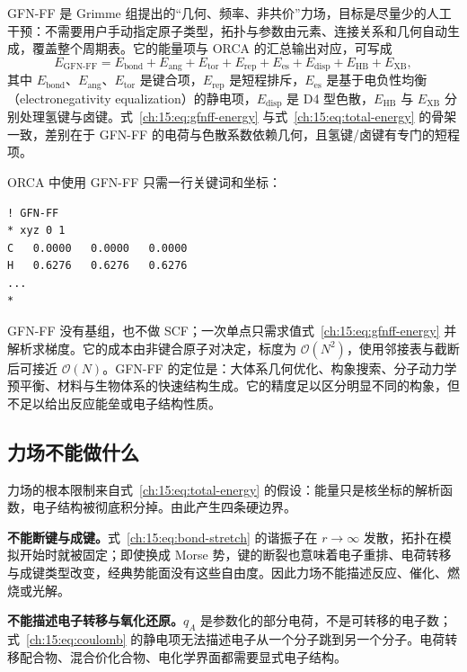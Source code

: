 GFN-FF 是 Grimme 组提出的“几何、频率、非共价”力场，目标是尽量少的人工干预：不需要用户手动指定原子类型，拓扑与参数由元素、连接关系和几何自动生成，覆盖整个周期表\citep{spicher2020gfnff}。它的能量项与 ORCA 的汇总输出对应，可写成
\begin{equation}
E_{\text{GFN-FF}}
= E_{\mathrm{bond}} + E_{\mathrm{ang}} + E_{\mathrm{tor}}
+ E_{\mathrm{rep}} + E_{\mathrm{es}} + E_{\mathrm{disp}}
+ E_{\mathrm{HB}} + E_{\mathrm{XB}},
\label{ch:15:eq:gfnff-energy}
\end{equation}
其中 $E_{\mathrm{bond}}$、$E_{\mathrm{ang}}$、$E_{\mathrm{tor}}$ 是键合项，$E_{\mathrm{rep}}$ 是短程排斥，$E_{\mathrm{es}}$ 是基于电负性均衡（electronegativity equalization）的静电项，$E_{\mathrm{disp}}$ 是 D4 型色散，$E_{\mathrm{HB}}$ 与 $E_{\mathrm{XB}}$ 分别处理氢键与卤键。式~\eqref{ch:15:eq:gfnff-energy} 与式~\eqref{ch:15:eq:total-energy} 的骨架一致，差别在于 GFN-FF 的电荷与色散系数依赖几何，且氢键/卤键有专门的短程项。

ORCA 中使用 GFN-FF 只需一行关键词和坐标：
\begin{lstlisting}
! GFN-FF
* xyz 0 1
C   0.0000   0.0000   0.0000
H   0.6276   0.6276   0.6276
...
*
\end{lstlisting}
GFN-FF 没有基组，也不做 SCF；一次单点只需求值式~\eqref{ch:15:eq:gfnff-energy} 并解析求梯度。它的成本由非键合原子对决定，标度为 $\mathcal{O}(N^2)$，使用邻接表与截断后可接近 $\mathcal{O}(N)$。GFN-FF 的定位是：大体系几何优化、构象搜索、分子动力学预平衡、材料与生物体系的快速结构生成。它的精度足以区分明显不同的构象，但不足以给出反应能垒或电子结构性质。

\subsection{力场不能做什么}
\label{ch:15:sec:limits}

力场的根本限制来自式~\eqref{ch:15:eq:total-energy} 的假设：能量只是核坐标的解析函数，电子结构被彻底积分掉。由此产生四条硬边界。

\textbf{不能断键与成键。}式~\eqref{ch:15:eq:bond-stretch} 的谐振子在 $r\to\infty$ 发散，拓扑在模拟开始时就被固定；即使换成 Morse 势，键的断裂也意味着电子重排、电荷转移与成键类型改变，经典势能面没有这些自由度。因此力场不能描述反应、催化、燃烧或光解。

\textbf{不能描述电子转移与氧化还原。}$q_A$ 是参数化的部分电荷，不是可转移的电子数；式~\eqref{ch:15:eq:coulomb} 的静电项无法描述电子从一个分子跳到另一个分子。电荷转移配合物、混合价化合物、电化学界面都需要显式电子结构。

